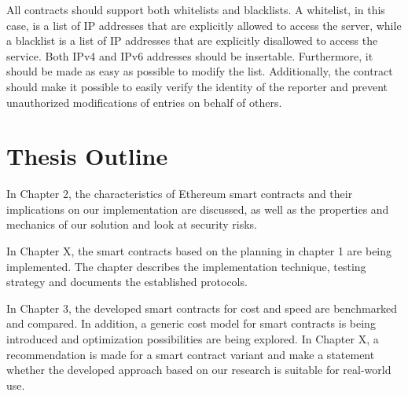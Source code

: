 All contracts should support both whitelists and blacklists.
A whitelist, in this case, is a list of IP addresses that are explicitly allowed to access the server, while a blacklist is a list of IP addresses that are explicitly disallowed to access the service.
Both IPv4 and IPv6 addresses should be insertable. Furthermore, it should be made as easy as possible to modify the list. Additionally, the contract should make it possible to easily verify the identity of the reporter and prevent unauthorized modifications of entries on behalf of others. 

\section{Thesis Outline}

In Chapter 2, the characteristics of Ethereum smart contracts and their implications on our implementation are discussed, as well as the properties and mechanics of our solution and look at security risks.

In Chapter X, the smart contracts based on the planning in chapter 1 are being implemented. The chapter describes the implementation technique, testing strategy and documents the established protocols.

In Chapter 3, the developed smart contracts for cost and speed are benchmarked and compared. In addition, a generic cost model for smart contracts is being introduced and optimization possibilities are being explored.
In Chapter X, a recommendation is made for a smart contract variant and make a statement whether the developed approach based on our research is suitable for real-world use.
